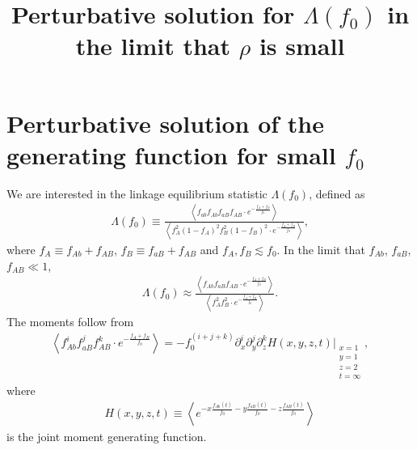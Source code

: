 \documentclass[11pt]{article}
\title{\vspace{-36 pt} \Large Perturbative solution for $\Lambda(f_0)$ in the limit that $\rho$ is small \vspace{-36 pt}}
\date{}
\begin{document}
\section*{Perturbative solution of the generating function for small $f_0$}
We are interested in the linkage equilibrium statistic $\Lambda(f_0)$, defined as
\begin{align}
    \Lambda(f_0) \equiv \frac{\left\langle f_{ab}f_{Ab}f_{aB}f_{AB} \cdot e^{-\frac{f_{A}+f_{B}}{f_0}}\right\rangle}{\left\langle f_A^2(1-f_A)^2f_B^2(1-f_B)^2\cdot e^{-\frac{f_{A}+f_{B}}{f_0}}\right\rangle},
\end{align}
where $f_A \equiv f_{Ab} + f_{AB}$, $f_B \equiv f_{aB} + f_{AB}$ and $f_A, f_B \lesssim f_0$.
In the limit that $f_{Ab}$, $f_{aB}$, $f_{AB} \ll1$, 
\begin{align}\label{eq:lambda_small_f}
    \Lambda(f_0) \approx \frac{\left\langle f_{Ab}f_{aB}f_{AB} \cdot e^{-\frac{f_{A}+f_{B}}{f_0}}\right\rangle}{\left\langle f_A^2f_B^2\cdot e^{-\frac{f_{A}+f_{B}}{f_0}}\right\rangle}.
\end{align}
The moments follow from 
\begin{align}\label{eq:lambda_numerator}
    \left\langle f_{Ab}^if_{aB}^jf_{AB}^k\cdot e^{-\frac{f_{A}+f_{B}}{f_0}}\right\rangle
    = -f_0^{(i+j+k)} \partial_x^i \partial_y^j \partial_z^k H(x, y, z, t) \Bigg\vert_{\substack{x=1 \\ y=1 \\ z=2 \\ t=\infty}},
\end{align}
where %
\begin{align}
    H(x, y, z, t) \equiv \left\langle e^{-x\frac{f_{Ab}(t)}{f_0}-y\frac{f_{aB}(t)}{f_0}-z\frac{f_{AB}(t)}{f_0}} \right\rangle 
\end{align}
is the joint moment generating function. 
\end{document}
